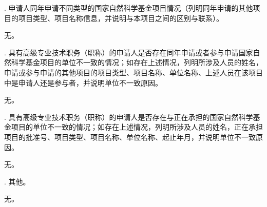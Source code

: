 \documentclass[12pt,UTF8,AutoFakeBold=3,a4paper]{ctexart} %
\newcommand{\sihao}{\fontsize{14pt}{\baselineskip}\selectfont}
\begin{document}
{\sihao \color{MsBlue} . 申请人同年申请不同类型的国家自然科学基金项目情况（列明同年申请的其他项目的项目类型、项目名称信息，并说明与本项目之间的区别与联系）。 }

\vspace{0.25 \baselineskip}
{\kaishu 无。}
\vspace{0.25 \baselineskip}

{\sihao \color{MsBlue} . 具有高级专业技术职务（职称）的申请人是否存在同年申请或者参与申请国家自然科学基金项目的单位不一致的情况；如存在上述情况，列明所涉及人员的姓名，申请或参与申请的其他项目的项目类型、项目名称、单位名称、上述人员在该项目中是申请人还是参与者，并说明单位不一致原因。}

\vspace{0.25 \baselineskip}
{\kaishu 无。}
\vspace{0.25 \baselineskip}

{\sihao \color{MsBlue} . 具有高级专业技术职务（职称）的申请人是否存在与正在承担的国家自然科学基金项目的单位不一致的情况；如存在上述情况，列明所涉及人员的姓名，正在承担项目的批准号、项目类型、项目名称、单位名称、起止年月，并说明单位不一致原因。}

\vspace{0.25 \baselineskip}
{\kaishu 无。}
\vspace{0.25 \baselineskip}

{\sihao \color{MsBlue} . 其他。}

\vspace{0.25 \baselineskip}
{\kaishu 无。}
\vspace{0.25 \baselineskip}
\end{document}
